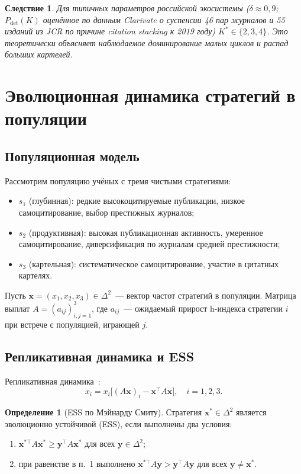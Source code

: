 \documentclass[12pt,a4paper]{article}
\newtheorem{corollary}{Следствие}
\theoremstyle{definition}
\newtheorem{definition}{Определение}
\begin{document}
\begin{corollary}
  Для типичных параметров российской экосистемы ($\delta \approx
    0{,}9$; $P_{\mathrm{det}}(K)$ оценённое по данным Clarivate о
    суспенсии 46 пар журналов и 55 изданий из JCR по причине citation
  stacking к 2019 году) $K^{*} \in \{2, 3, 4\}$. Это теоретически
  объясняет наблюдаемое доминирование малых циклов и распад больших картелей.
\end{corollary}

\section{Эволюционная динамика стратегий в популяции}
\label{sec:ess}

\subsection{Популяционная модель}

Рассмотрим популяцию учёных с тремя чистыми стратегиями:
\begin{itemize}
  \item $s_1$ (глубинная): редкие высокоцитируемые публикации, низкое
    самоцитирование, выбор престижных журналов;
  \item $s_2$ (продуктивная): высокая публикационная активность,
    умеренное самоцитирование, диверсификация по журналам средней престижности;
  \item $s_3$ (картельная): систематическое самоцитирование, участие
    в цитатных картелях.
\end{itemize}

Пусть $\bm{x} = (x_1, x_2, x_3) \in \Delta^2$~--- вектор частот
стратегий в популяции. Матрица выплат $A = (a_{ij})_{i,j=1}^{3}$, где
$a_{ij}$~--- ожидаемый прирост h-индекса стратегии $i$ при встрече с
популяцией, играющей $j$.

\subsection{Репликативная динамика и ESS}

Репликативная динамика~\citep{taylor1978}:
\begin{equation}
  \dot{x}_i = x_i \bigl[(A\bm{x})_i - \bm{x}^{\top} A \bm{x}\bigr],
  \quad i = 1, 2, 3.
  \label{eq:replicator}
\end{equation}

\begin{definition}[ESS по Мэйнарду Смиту]
  Стратегия $\bm{x}^{*} \in \Delta^2$ является эволюционно устойчивой
  (ESS), если выполнены два условия:
  \begin{enumerate}
    \item $\bm{x}^{*\top} A \bm{x}^{*} \geq \bm{y}^{\top} A
      \bm{x}^{*}$ для всех $\bm{y} \in \Delta^2$;
    \item при равенстве в п.~1 выполнено $\bm{x}^{*\top} A \bm{y} >
      \bm{y}^{\top} A \bm{y}$ для всех $\bm{y} \neq \bm{x}^{*}$.
  \end{enumerate}
\end{definition}
\end{document}
